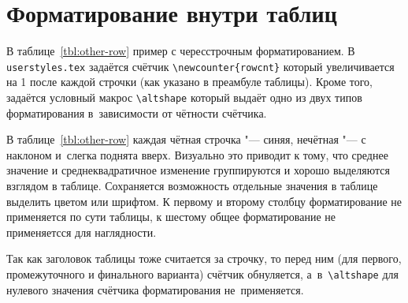 \section{Форматирование внутри таблиц} \label{AppendixB3}

В таблице~\ref{tbl:other-row} пример с чересстрочным
форматированием. В \verb+userstyles.tex+  задаётся счётчик
\verb+\newcounter{rowcnt}+ который увеличивается на 1 после каждой
строчки (как указано в преамбуле таблицы). Кроме того, задаётся
условный макрос \verb+\altshape+ который выдаёт одно из
двух типов форматирования в~зависимости от чётности счётчика. 

В таблице~\ref{tbl:other-row} каждая чётная строчка "--- синяя,
нечётная "--- с наклоном и~слегка поднята вверх. Визуально это приводит
к тому, что среднее значение и среднеквадратичное изменение
группируются и хорошо выделяются взглядом в таблице. Сохраняется
возможность отдельные значения в таблице выделить цветом или
шрифтом. К первому и второму столбцу форматирование не применяется по
сути таблицы, к шестому общее форматирование не применяетсся для
наглядности.

Так как заголовок таблицы тоже считается за строчку, то перед ним (для
первого, промежуточного и финального варианта) счётчик обнуляется,
а~в~\verb+\altshape+ для нулевого значения счётчика форматирования
не~применяется.


